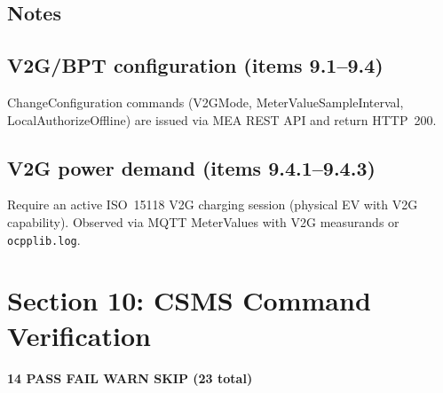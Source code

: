 \documentclass[10pt, a4paper]{article}
\begin{document}
\subsection*{Notes}

\subsection*{V2G/BPT configuration (items 9.1--9.4)}
ChangeConfiguration commands (V2GMode, MeterValueSampleInterval, LocalAuthorizeOffline)
are issued via MEA REST API and return HTTP~200.

\subsection*{V2G power demand (items 9.4.1--9.4.3)}
Require an active ISO~15118 V2G charging session (physical EV with V2G capability).
Observed via MQTT MeterValues with V2G measurands or \texttt{ocpplib.log}.



\newpage
\section{Section 10: CSMS Command Verification}
\textbf{14 PASS  FAIL  WARN  SKIP \quad (23 total)}
\end{document}

